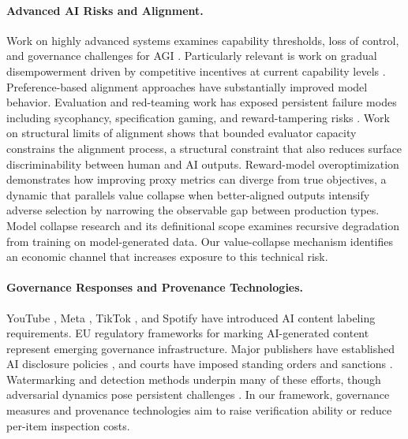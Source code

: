 \documentclass{article}
\theoremstyle{plain}
\theoremstyle{definition}
\theoremstyle{remark}
\begin{document}
\paragraph{Advanced AI Risks and Alignment.}
Work on highly advanced systems examines capability thresholds, loss of control, and governance challenges for AGI \citep{hendrycks2025definitionagi, Bostrom2014-BOSS, russell2019human}. Particularly relevant is work on gradual disempowerment driven by competitive incentives at current capability levels \citep{kulveit2025gradualdisempowermentsystemicexistential}. Preference-based alignment approaches \citep{ziegler2020finetuninglanguagemodelshuman, NEURIPS2022_b1efde53, bai2022traininghelpfulharmlessassistant, bai2022constitutionalaiharmlessnessai} have substantially improved model behavior. Evaluation and red-teaming work has exposed persistent failure modes including sycophancy, specification gaming, and reward-tampering risks \citep{perez-etal-2023-discovering, denison2024sycophancysubterfugeinvestigatingrewardtampering, sharma2024towards}. Work on structural limits of alignment \citep{cao2025alignmentbottleneck} shows that bounded evaluator capacity constrains the alignment process, a structural constraint that also reduces surface discriminability between human and AI outputs. Reward-model overoptimization \citep{gao2023scaling} demonstrates how improving proxy metrics can diverge from true objectives, a dynamic that parallels value collapse when better-aligned outputs intensify adverse selection by narrowing the observable gap between production types. Model collapse research \citep{shumailov2024curserecursiontraininggenerated, alemohammad2024selfconsuming} and its definitional scope \citep{schaeffer2025positionmodelcollapsedoes} examines recursive degradation from training on model-generated data. Our value-collapse mechanism identifies an economic channel that increases exposure to this technical risk.

\paragraph{Governance Responses and Provenance Technologies.}
YouTube \citep{youtube2024disclose}, Meta \citep{meta2025labeling}, TikTok \citep{tiktok2024transparency}, and Spotify \citep{spotify2025protections} have introduced AI content labeling requirements. EU regulatory frameworks for marking AI-generated content \citep{eu2025codepractice} represent emerging governance infrastructure. Major publishers have established AI disclosure policies \citep{gewaltig-2025-ai, zhu-2025-generative}, and courts have imposed standing orders and sanctions \citep{mata2023sanctions, baylson2023aiorder}. Watermarking \citep{pmlr-v202-kirchenbauer23a, zhao2024provable} and detection methods underpin many of these efforts, though adversarial dynamics pose persistent challenges \citep{sadasivan2025aigeneratedtextreliablydetected}. In our framework, governance measures and provenance technologies aim to raise verification ability or reduce per-item inspection costs. 
\end{document}
